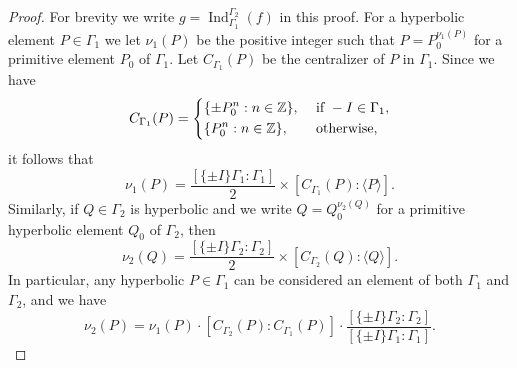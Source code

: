\documentclass{article}
\theoremstyle{named}
\newcommand{\Z}{\mathbb{Z}}
\DeclareMathOperator{\Ind}{Ind}
\begin{document}
\begin{proof}
For brevity we write $g = \Ind_{\Gamma_1}^{\Gamma_2}(f)$ in this proof. For a hyperbolic element $P \in \Gamma_1$ we let $\nu_1(P)$ be the positive integer such that $P = P_0^{\nu_1(P)}$ for a primitive element $P_0$ of $\Gamma_1$. Let $C_{\Gamma_1}(P)$ be the centralizer of $P$ in $\Gamma_1$. Since we have 
\begin{equation*}
    C_{\Gamma_1}(P) = \begin{dcases}
        \{\pm P_0^n : n \in \Z\}, & \text{ if }-I \in \Gamma_1,\\
        \{P_0^n : n \in \Z\}, & \text{ otherwise},
    \end{dcases}
\end{equation*}
it follows that
\begin{equation*}
\nu_1(P) = \frac{[\{\pm I\}\Gamma_1: \Gamma_1]}{2} \times [C_{\Gamma_1}(P) : \langle P \rangle].
\end{equation*} 
Similarly, if $Q \in \Gamma_2$ is hyperbolic and we write $Q = Q_0^{\nu_2(Q)}$ for a primitive hyperbolic element $Q_0$ of $\Gamma_2$, then 
\begin{equation*}
    \nu_2(Q) = \frac{[\{\pm I\}\Gamma_2: \Gamma_2]}{2} \times [C_{\Gamma_2}(Q) : \langle Q \rangle].
\end{equation*}
In particular, any hyperbolic $P \in \Gamma_1$ can be considered an element of both $\Gamma_1$ and $\Gamma_2$, and we have 
\begin{equation}\label{eq:sec2:auxeq1}
    \nu_2(P) = \nu_1(P) \cdot [C_{\Gamma_2}(P): C_{\Gamma_1}(P)] \cdot \frac{[\{\pm I\}\Gamma_2: \Gamma_2]}{[\{\pm I\}\Gamma_1: \Gamma_1]}.
\end{equation}


\end{proof}
\end{document}
